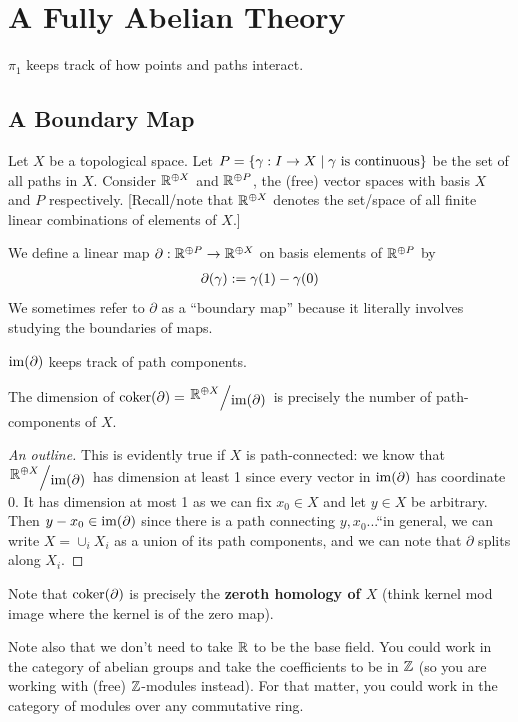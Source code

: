 \section{A Fully Abelian Theory}


$\pi_1$ keeps track of how points and paths interact.

\subsection{A Boundary Map}

Let $X$ be a topological space. Let $P = \left\{ \gamma : I \to X \; \middle\vert \; \gamma \text{ is continuous} \right\}$ be the set of all paths in $X$. Consider $\mathbb{R}^{\oplus X}$ and $\mathbb{R}^{\oplus P}$, the (free) vector spaces with basis $X$ and $P$ respectively. [Recall/note that $\mathbb{R}^{\oplus X}$ denotes the set/space of all finite linear combinations of elements of $X$.]

We define a linear map $\partial : \mathbb{R}^{\oplus P} \to \mathbb{R}^{\oplus X}$ on basis elements of $\mathbb{R}^{\oplus P}$ by
\begin{align*}
    \partial\!\left( \gamma \right) := \gamma(1) - \gamma(0)
\end{align*}
We sometimes refer to $\partial$ as a ``boundary map'' because it literally involves studying the boundaries of maps.

$\operatorname{im}\!\left( \partial \right)$ keeps track of path components.

\begin{boxlemma}
    The dimension of $\coker{\del} = \quotient{\R^{\+ X}}{\pim{\del}}$ is precisely the number of path-components of $X$.
\end{boxlemma}
\begin{proof}[An outline]
    This is evidently true if $X$ is path-connected: we know that $\quotient{\R^{\+ X}}{\pim{\del}}$ has dimension at least 1 since every vector in $\operatorname{im}\!\left( \partial \right)$ has coordinate 0. It has dimension at most 1 as we can fix $x_0\in X$ and let $y\in X$ be arbitrary. Then $y-x_0\in \operatorname{im}\!\left( \partial \right)$ since there is a path connecting $y, x_0$...``in general, we can write $X=\cup_{i}X_i$ as a union of its path components, and we can note that $\partial$ splits along $X_i$.
\end{proof}

Note that $\operatorname{coker}\!\left( \partial \right)$ is precisely the \textbf{zeroth homology of $X$} (think kernel mod image where the kernel is of the zero map).

Note also that we don't need to take $\mathbb{R}$ to be the base field. You could work in the category of abelian groups and take the coefficients to be in $\mathbb{Z}$ (so you are working with (free) $\mathbb{Z}$-modules instead). For that matter, you could work in the category of modules over any commutative ring.

